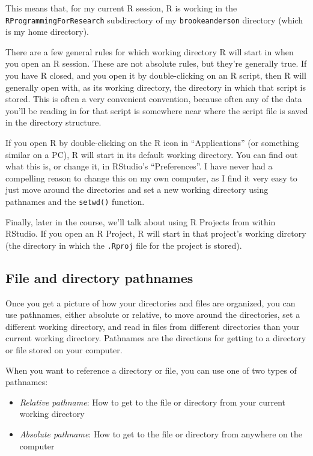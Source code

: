 \documentclass[]{book}
\providecommand{\tightlist}{%
  \setlength{\itemsep}{0pt}\setlength{\parskip}{0pt}}
\theoremstyle{definition}
\theoremstyle{definition}
\theoremstyle{definition}
\theoremstyle{remark}
\begin{document}
This means that, for my current R session, R is working in the
\texttt{RProgrammingForResearch} subdirectory of my
\texttt{brookeanderson} directory (which is my home directory).

There are a few general rules for which working directory R will start
in when you open an R session. These are not absolute rules, but they're
generally true. If you have R closed, and you open it by double-clicking
on an R script, then R will generally open with, as its working
directory, the directory in which that script is stored. This is often a
very convenient convention, because often any of the data you'll be
reading in for that script is somewhere near where the script file is
saved in the directory structure.

If you open R by double-clicking on the R icon in ``Applications'' (or
something similar on a PC), R will start in its default working
directory. You can find out what this is, or change it, in RStudio's
``Preferences''. I have never had a compelling reason to change this on
my own computer, as I find it very easy to just move around the
directories and set a new working directory using pathnames and the
\texttt{setwd()} function.

Finally, later in the course, we'll talk about using R Projects from
within RStudio. If you open an R Project, R will start in that project's
working dirctory (the directory in which the \texttt{.Rproj} file for
the project is stored).

\subsection{File and directory
pathnames}\label{file-and-directory-pathnames}

Once you get a picture of how your directories and files are organized,
you can use pathnames, either absolute or relative, to move around the
directories, set a different working directory, and read in files from
different directories than your current working directory. Pathnames are
the directions for getting to a directory or file stored on your
computer.

When you want to reference a directory or file, you can use one of two
types of pathnames:

\begin{itemize}
\tightlist
\item
  \emph{Relative pathname}: How to get to the file or directory from
  your current working directory
\item
  \emph{Absolute pathname}: How to get to the file or directory from
  anywhere on the computer
\end{itemize}
\end{document}
